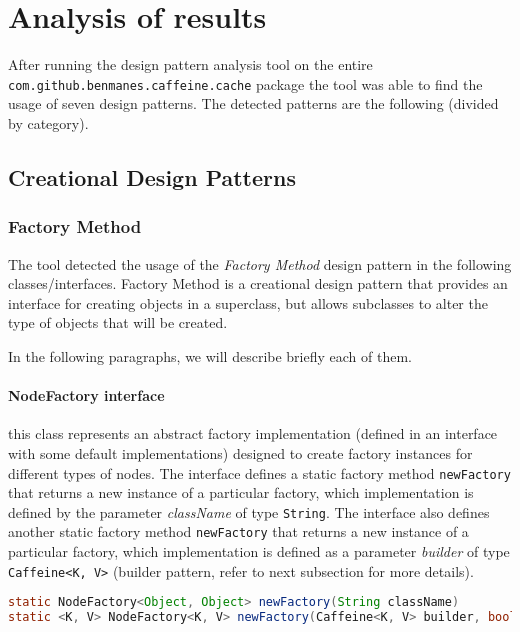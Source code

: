\section{Analysis of results}

After running the design pattern analysis tool on the entire \texttt{com.github.benmanes.caffeine.cache} package the tool was able to find the usage of seven design patterns. The detected patterns are the following (divided by category).

\subsection{Creational Design Patterns}

\subsubsection{Factory Method}

The tool detected the usage of the \textit{Factory Method} design pattern in the following classes/interfaces. Factory Method is a creational design pattern that provides an interface for creating objects in a superclass, but allows subclasses to alter the type of objects that will be created.

In the following paragraphs, we will describe briefly each of them.

\paragraph{NodeFactory interface} this class represents an abstract factory implementation (defined in an interface with some default implementations) designed to create factory instances for different types of nodes. The interface defines a static factory method \texttt{newFactory} that returns a new instance of a particular factory, which implementation is defined by the parameter \textit{className} of type \texttt{String}. The interface also defines another static factory method \texttt{newFactory} that returns a new instance of a particular factory, which implementation is defined as a parameter \textit{builder} of type \texttt{Caffeine<K, V>} (builder pattern, refer to next subsection for more details).

\begin{lstlisting}[language=Java]
static NodeFactory<Object, Object> newFactory(String className)
static <K, V> NodeFactory<K, V> newFactory(Caffeine<K, V> builder, boolean isAsync)
\end{lstlisting}

